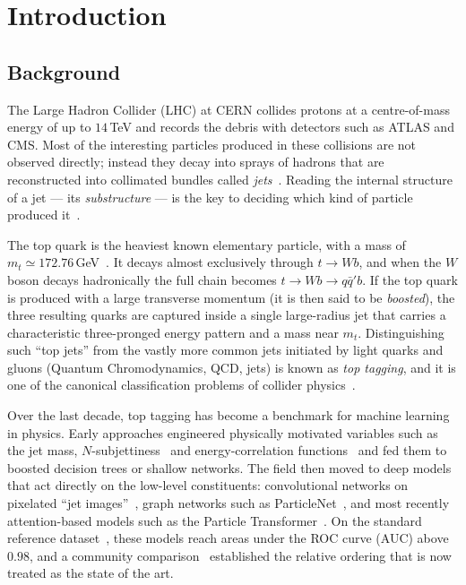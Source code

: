 \chapter{Introduction}
\label{chap:introduction}

\section{Background}
\label{sec:background}

The Large Hadron Collider (LHC) at CERN collides protons at a
centre-of-mass energy of up to $14$\,TeV and records the debris with
detectors such as ATLAS and CMS. Most of the interesting particles produced
in these collisions are not observed directly; instead they decay into
sprays of hadrons that are reconstructed into collimated bundles called
\emph{jets}~\citep{cacciari2008,salam2010}. Reading the internal structure
of a jet --- its \emph{substructure} --- is the key to deciding which kind
of particle produced it~\citep{larkoski2020,kogler2019}.

The top quark is the heaviest known elementary particle, with a mass of
$m_t\simeq172.76$\,GeV~\citep{pdg2022}. It decays almost exclusively through
$t\rightarrow Wb$, and when the $W$ boson decays hadronically the full chain
becomes $t\rightarrow Wb\rightarrow q\bar{q}'b$. If the top quark is produced
with a large transverse momentum (it is then said to be \emph{boosted}), the
three resulting quarks are captured inside a single large-radius jet that
carries a characteristic three-pronged energy pattern and a mass near
$m_t$. Distinguishing such ``top jets'' from the vastly more common jets
initiated by light quarks and gluons (Quantum Chromodynamics, QCD, jets) is
known as \emph{top tagging}, and it is one of the canonical classification
problems of collider physics~\citep{kasieczka2019landscape}.

Over the last decade, top tagging has become a benchmark for machine
learning in physics. Early approaches engineered physically motivated
variables such as the jet mass, $N$-subjettiness~\citep{thaler2011} and
energy-correlation functions~\citep{larkoski2013} and fed them to boosted
decision trees or shallow networks. The field then moved to deep models that
act directly on the low-level constituents: convolutional networks on
pixelated ``jet images''~\citep{deoliveira2016,komiske2017}, graph networks
such as ParticleNet~\citep{qu2020particlenet}, and most recently
attention-based models such as the Particle
Transformer~\citep{qu2022particletransformer}. On the standard reference
dataset~\citep{kasieczka2019dataset}, these models reach areas under the ROC
curve (AUC) above $0.98$, and a community
comparison~\citep{kasieczka2019landscape} established the relative ordering
that is now treated as the state of the art.

